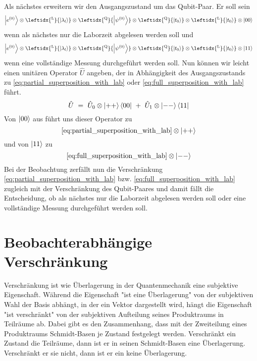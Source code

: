 \documentclass[12pt]{article}
\begin{document}
Als nächstes erweitern wir den Ausgangszustand um das Qubit-Paar. Er soll sein 
\begin{equation*}
\ket{e^{(0)}} 
\otimes \leftidx{^\mathrm{L}}{\ket{\lambda_l}} 
\otimes \leftidx{^\mathrm{Q}}{\ket{\psi^{(0)}}}
\otimes \leftidx{^\mathrm{Q}}{\ket{t_0}}
\otimes \leftidx{^\mathrm{L}}{\ket{t_0}}
\otimes \ket{00}
\end{equation*}
wenn als nächstes nur die Laborzeit abgelesen werden soll und 
\begin{equation*}
\ket{e^{(0)}} 
\otimes \leftidx{^\mathrm{L}}{\ket{\lambda_l}} 
\otimes \leftidx{^\mathrm{Q}}{\ket{\psi^{(0)}}}
\otimes \leftidx{^\mathrm{Q}}{\ket{t_0}}
\otimes \leftidx{^\mathrm{L}}{\ket{t_0}}
\otimes \ket{11}
\end{equation*}
wenn eine vollständige Messung durchgeführt werden soll. Nun können wir leicht einen unitären Operator $\hat{U}$ angeben, der in Abhängigkeit des Ausgangszustands zu \eqref{eq:partial_superposition_with_lab} oder \eqref{eq:full_superposition_with_lab} führt.
\begin{equation*}
\hat{U}\ =\ \hat{U}_0 \otimes \ket{++}\bra{00}\ +\ \hat{U}_1 \otimes \ket{--}\bra{11}
\end{equation*}
Von $\ket{00}$ aus führt uns dieser Operator zu 
\begin{equation*}
\eqref{eq:partial_superposition_with_lab} \otimes \ket{++}
\end{equation*}
und von $\ket{11}$ zu 
\begin{equation*}
\eqref{eq:full_superposition_with_lab} \otimes \ket{--}
\end{equation*}
Bei der Beobachtung zerfällt nun die Verschränkung \eqref{eq:partial_superposition_with_lab} bzw. \eqref{eq:full_superposition_with_lab} zugleich mit der Verschränkung des Qubit-Paares und damit fällt die Entscheidung, ob als nächstes nur die Laborzeit abgelesen werden soll oder eine vollständige Messung durchgeführt werden soll. 

\section{Beobachterabhängige Verschränkung}

Verschränkung ist wie Überlagerung in der Quantenmechanik eine subjektive Eigenschaft. Während die Eigenschaft "ist eine Überlagerung" von der subjektiven Wahl der Basis abhängt, in der ein Vektor dargestellt wird, hängt die Eigenschaft "ist verschränkt" von der subjektiven Aufteilung seines Produktraums in Teilräume ab. Dabei gibt es den Zusammenhang, dass mit der Zweiteilung eines Produktraums Schmidt-Basen je Zustand festgelegt werden. Verschränkt ein Zustand die Teilräume, dann ist er in seinen Schmidt-Basen eine Überlagerung. Verschränkt er sie nicht, dann ist er ein keine Überlagerung.
\end{document}
